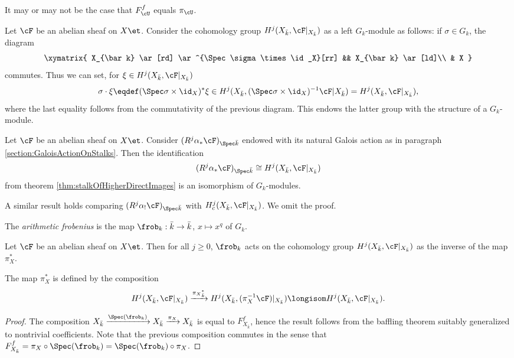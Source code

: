 \begin{remark}
It may or may not be the case that $F^f_\cU$ equals $\pi_\cU$.
\end{remark}

Let $\cF$ be an abelian sheaf on $X\et$. Consider the cohomology group $H^j (X_{\bar k}, \cF|_{X_{\bar k}})$ as a left $G_k$-module as follows: if $\sigma \in G_k$, the diagram 
$$
\xymatrix{
X_{\bar k} \ar[rd] \ar^{\Spec \sigma \times \id_X}[rr] && X_{\bar k} \ar[ld]\\
& X
}
$$
commutes. Thus we can set, for $\xi \in H^j (X_{\bar k}, \cF|_{X_{\bar k}})$
$$
\sigma \cdot \xi \eqdef (\Spec \sigma \times \id_X)^*\xi \in H^j(X_{\bar k}, (\Spec \sigma \times \id_X)^{-1} \cF|{X_{\bar k}})
= H^j (X_{\bar k}, \cF|_{X_{\bar k}}),
$$
where the last equality follows from the commutativity of the previous diagram. This endows the latter group with the structure of a $G_k$-module.

\begin{lem}
Let $\cF$ be an abelian sheaf on $X\et$. Consider $(R^j\alpha_*\cF)_{\Spec \bar k}$ endowed with its natural Galois action as in paragraph \ref{section:GaloisActionOnStalks}. Then the identification
$$
(R^j\alpha_*\cF)_{\Spec \bar k} \cong H^j (X_{\bar k}, \cF|_{X_{\bar k}})
$$
from theorem \ref{thm:stalkOfHigherDirectImages} is an isomorphism of $G_k$-modules.
\end{lem}

A similar result holds comparing $(R^j\alpha_!\cF)_{\Spec \bar k}$ with $H^j_c (X_{\bar k}, \cF|_{X_{\bar k}})$. We omit the proof.

\begin{defi}
The \emph{arithmetic frobenius} is the map $\frob_k : \bar k \to \bar k$, $x \mapsto x^q$  of $G_k$.
\end{defi}

\begin{thm}
Let $\cF$ be an abelian sheaf on $X\et$. Then for all $j\geqslant 0$, $\frob_k$ acts on the cohomology group $H^j(X_{\bar k}, \cF|_{X_{\bar k}})$ as the inverse of the map $\pi_X^*$.
\end{thm}

The map $\pi_X^*$ is defined by the composition
$$
H^j(X_{\bar k}, \cF|_{X_{\bar k}}) \xrightarrow{{\pi_X}_{\bar k}^*}
H^j(X_{\bar k}, (\pi_X^{-1} \cF)|_{X_{\bar k}}) \longisom
H^j(X_{\bar k}, \cF|_{X_{\bar k}}).
$$

\begin{proof}
The composition $X_{\bar k} \xrightarrow{\Spec(\frob_k)} X_{\bar k} \xrightarrow{\pi_X} X_{\bar k}$ is equal to $F_{X_{\bar k}}^f$, hence the result follows from the baffling theorem suitably generalized to nontrivial coefficients. Note that the previous composition commutes in the sense that $F_{X_{\bar k}}^f = \pi_X \circ \Spec(\frob_k) = \Spec(\frob_k) \circ \pi_X$.
\end{proof}

